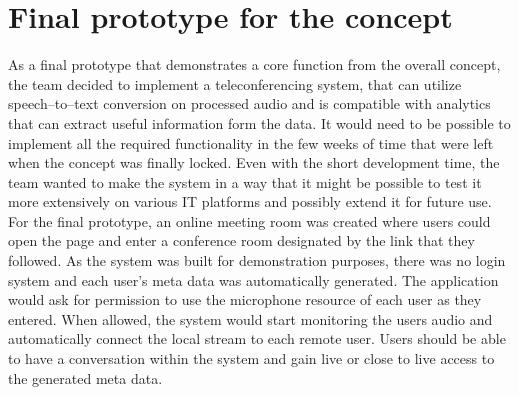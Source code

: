 \documentclass[english,12pt,a4paper,dvips]{article}
\begin{document}

\clearpage

\section{Final prototype for the concept}


As a final prototype that demonstrates a core function from the overall concept, the team decided to implement a teleconferencing system, that can utilize speech--to--text conversion on processed audio and is compatible with analytics that can extract useful information form the data. It would need to be possible to implement all the required functionality in the few weeks of time that were left when the concept was finally locked. Even with the short development time, the team wanted to make the system in a way that it might be possible to test it more extensively on various IT platforms and possibly extend it for future use.
For the final prototype, an online meeting room was created where users could open the page and enter a conference room designated by the link that they followed. As the system was built for demonstration purposes, there was no login system and each user's meta data was automatically generated. The application would ask for permission to use the microphone resource of each user as they entered. When allowed, the system would start monitoring the users audio and automatically connect the local stream to each remote user. Users should be able to have a conversation within the system and gain live or close to live access to the generated meta data.
\end{document}
